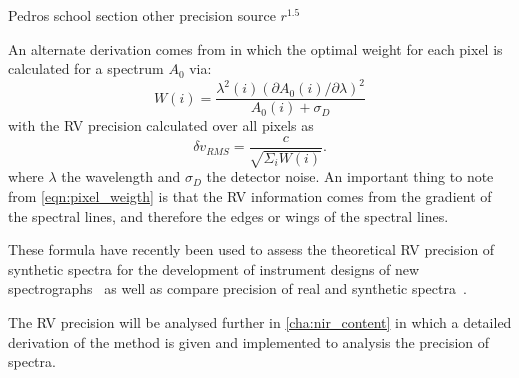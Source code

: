 Pedros school section other precision source \({r}^{1.5}\)\todo{}


An alternate derivation comes from \citet{bouchy_fundamental_2001} in which the optimal weight for each pixel is calculated for a spectrum $A_0$ via:
\begin{equation}
    W(i) = \frac{\lambda^{2}(i) {(\partial A_0(i)/\partial\lambda)}^{2}}{A_0(i) + \sigma_D} \label{eqn:pixel_weigth}
\end{equation}
with the RV precision calculated over all pixels as
\begin{equation}
    \delta v_{RMS} = \frac{c}{\sqrt{\Sigma_i W(i)}}.
\end{equation}
where $\lambda$ the wavelength and $\sigma_D$ the detector noise. An important thing to note from \cref{eqn:pixel_weigth} is that the RV information comes from the gradient of the spectral lines, and therefore the edges or wings of the spectral lines.

These formula have recently been used to assess the theoretical RV precision of synthetic spectra for the development of instrument designs of new \nir{} spectrographs~\citep[e.g.][]{figueira_radial_2016} as well as compare precision of real and synthetic spectra~\citep[e.g.][]{artigau_optical_2018}.
 
The RV precision will be analysed further in \cref{cha:nir_content} in which a detailed derivation of the \citet{bouchy_fundamental_2001} method is given and implemented to analysis the precision of \nir{} spectra.
